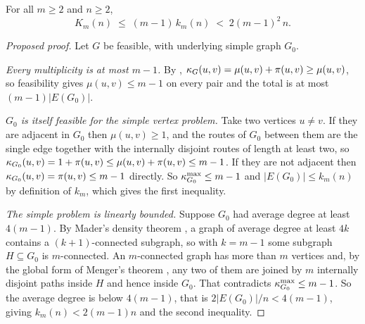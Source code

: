 \begin{conjecture}\label{prop:multi-vertex-upper}
For all $m \ge 2$ and $n \ge 2$,
\[
    K_m(n) \;\le\; (m-1)\,k_m(n) \;<\; 2(m-1)^2\,n .
\]
\end{conjecture}

\begin{proof}[Proposed proof]
Let $G$ be feasible, with underlying simple graph $G_0$.

\emph{Every multiplicity is at most $m-1$.} By , $\kappa_G(u,v) = \mu(u,v) + \pi(u,v) \ge \mu(u,v)$, so feasibility gives $\mu(u,v) \le m-1$ on every pair and the total is at most $(m-1)|E(G_0)|$.

\emph{$G_0$ is itself feasible for the simple vertex problem.} Take two vertices $u \ne v$. If they are adjacent in $G_0$ then $\mu(u,v) \ge 1$, and the routes of $G_0$ between them are the single edge together with the internally disjoint routes of length at least two, so $\kappa_{G_0}(u,v) = 1 + \pi(u,v) \le \mu(u,v) + \pi(u,v) \le m-1$. If they are not adjacent then $\kappa_{G_0}(u,v) = \pi(u,v) \le m-1$ directly. So $\kappa^{\max}_{G_0} \le m-1$ and $|E(G_0)| \le k_m(n)$ by definition of $k_m$, which gives the first inequality.

\emph{The simple problem is linearly bounded.} Suppose $G_0$ had average degree at least $4(m-1)$. By Mader's density theorem \cite{Mader72}, a graph of average degree at least $4k$ contains a $(k+1)$-connected subgraph, so with $k = m-1$ some subgraph $H \subseteq G_0$ is $m$-connected. An $m$-connected graph has more than $m$ vertices and, by the global form of Menger's theorem \cite[Ch.~3]{Diestel17}, any two of them are joined by $m$ internally disjoint paths inside $H$ and hence inside $G_0$. That contradicts $\kappa^{\max}_{G_0} \le m-1$. So the average degree is below $4(m-1)$, that is $2|E(G_0)|/n < 4(m-1)$, giving $k_m(n) < 2(m-1)n$ and the second inequality.
\end{proof}

